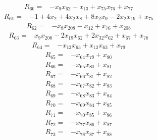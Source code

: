 {\begin{align*}
R_{60} ={}& -x_{9} x_{62} - x_{13} + x_{75} x_{76} + x_{77}
\end{align*}
\begin{align*}
R_{61} ={}& -1 + 4x_{2} + 4x_{2} x_{8} + 8x_{2} x_{9} - 2x_{2} x_{19} + x_{75}
\end{align*}
\begin{align*}
R_{62} ={}& -x_{8} x_{208} - x_{12} + x_{76} + x_{208}
\end{align*}
\begin{align*}
R_{63} ={}& x_{9} x_{208} - 2x_{19} x_{62} + 2x_{32} x_{62} + x_{67} + x_{78}
\end{align*}
\begin{align*}
R_{64} ={}& -x_{12} x_{63} + x_{13} x_{63} + x_{79}
\end{align*}
\begin{align*}
R_{65} ={}& -x_{64} x_{79} + x_{80}
\end{align*}
\begin{align*}
R_{66} ={}& -x_{65} x_{80} + x_{81}
\end{align*}
\begin{align*}
R_{67} ={}& -x_{66} x_{81} + x_{82}
\end{align*}
\begin{align*}
R_{68} ={}& -x_{67} x_{82} + x_{83}
\end{align*}
\begin{align*}
R_{69} ={}& -x_{68} x_{83} + x_{84}
\end{align*}
\begin{align*}
R_{70} ={}& -x_{69} x_{84} + x_{85}
\end{align*}
\begin{align*}
R_{71} ={}& -x_{70} x_{85} + x_{86}
\end{align*}
\begin{align*}
R_{72} ={}& -x_{77} x_{86} + x_{87}
\end{align*}
\begin{align*}
R_{73} ={}& -x_{78} x_{87} + x_{88}

\end{align*}}
